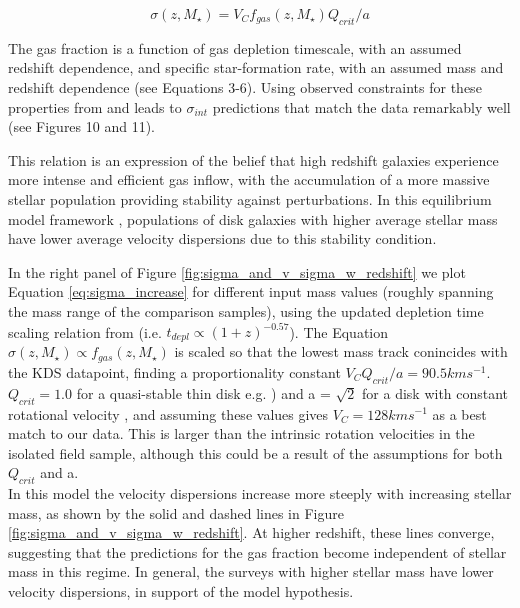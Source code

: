 \documentclass[fleqn,usenatbib]{mnras}
\begin{document}
\begin{equation}\label{eq:sigma_increase}
    \sigma(z,M_{\star}) = V_{C}f_{gas}(z,M_{\star})Q_{crit}/a
\end{equation}

The gas fraction is a function of gas depletion timescale, with an assumed redshift dependence, and specific star-formation rate, with an assumed mass and redshift dependence (see \citealt{Wisnioski2015} Equations 3-6).
Using observed constraints for these properties from \cite{Tacconi2013} and \cite{Whitaker2014} leads to $\sigma_{int}$ predictions that match the data remarkably well (see \citealt{Wisnioski2015} Figures 10 and 11).

This relation is an expression of the belief that high redshift galaxies experience more intense and efficient gas inflow, with the accumulation of a more massive stellar population providing stability against perturbations.
In this equilibrium model framework \citep[e.g.][]{Dave2012,Lilly2013,Saintonge2013}, populations of disk galaxies with higher average stellar mass have lower average velocity dispersions due to this stability condition.

In the right panel of Figure \ref{fig:sigma_and_v_sigma_w_redshift} we plot Equation \ref{eq:sigma_increase} for different input mass values (roughly spanning the mass range of the comparison samples), using the updated depletion time scaling relation from \cite{Tacconi2017} (i.e. $t_{depl} \propto (1 + z)^{-0.57}$).
The Equation $\sigma(z,M_{\star})\propto f_{gas}(z,M_{\star})$ is scaled so that the lowest mass track conincides with the KDS datapoint, finding a proportionality constant $V_{C}Q_{crit}/a = 90.5kms^{-1}$.
$Q_{crit} = 1.0$ for a quasi-stable thin disk e.g. \citealt{ForsterSchreiber2006,Burkert2010}) and a = $\sqrt{2}$ for a disk with constant rotational velocity \citep{Wisnioski2015}, and assuming these values gives $V_{C} = 128kms^{-1}$ as a best match to our data.
This is larger than the intrinsic rotation velocities in the isolated field sample, although this could be a result of the assumptions for both $Q_{crit}$ and a. \\

In this model the velocity dispersions increase more steeply with increasing stellar mass, as shown by the solid and dashed lines in Figure \ref{fig:sigma_and_v_sigma_w_redshift}.
At higher redshift, these lines converge, suggesting that the predictions for the gas fraction become independent of stellar mass in this regime.
In general, the surveys with higher stellar mass have lower velocity dispersions, in support of the model hypothesis.
\end{document}
